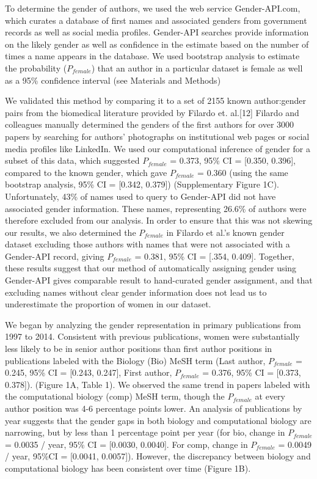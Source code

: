 \documentclass[10pt,letterpaper]{article}
\begin{document}
\begin{flushleft}
To determine the gender of authors, we used the web service Gender-API.com, which curates a database of first names and associated genders from government records as well as social media profiles. Gender-API searches provide information on the likely gender as well as confidence in the estimate based on the number of times a name appears in the database. We used bootstrap analysis to estimate the probability ($P_{female}$) that an author in a particular dataset is female as well as a 95\% confidence interval (see Materials and Methods)

We validated this method by comparing it to a set of 2155 known author:gender pairs from the biomedical literature provided by Filardo et. al.[12] Filardo and colleagues manually determined the genders of the first authors for over 3000 papers by searching for authors’ photographs on institutional web pages or social media profiles like LinkedIn. We used our computational inference of gender for a subset of this data, which suggested $P_{female}$ = 0.373, 95\% CI = [0.350, 0.396], compared to the known gender, which gave $P_{female}$ = 0.360 (using the same bootstrap analysis, 95\% CI = [0.342, 0.379]) (Supplementary Figure 1C). Unfortunately, 43\% of names used to query to Gender-API did not have associated gender information. These names, representing 26.6\% of authors were therefore excluded from our analysis. In order to ensure that this was not skewing our results, we also determined the $P_{female}$ in Filardo et al.'s known gender dataset excluding those authors with names that were not associated with a Gender-API record, giving $P_{female}$ = 0.381, 95\% CI = [.354, 0.409]. Together, these results suggest that our method of automatically assigning gender using Gender-API gives comparable result to hand-curated gender assignment, and that excluding names without clear gender information does not lead us to underestimate the proportion of women in our dataset.

We began by analyzing the gender representation in primary publications from 1997 to 2014. Consistent with previous publications, women were substantially less likely to be in senior author positions than first author positions in publications labeled with the Biology (Bio) MeSH term (Last author, $P_{female}$ = 0.245, 95\% CI = [0.243, 0.247], First author, $P_{female}$ = 0.376, 95\% CI = [0.373, 0.378]). (Figure 1A, Table 1). We observed the same trend in papers labeled with the computational biology (comp) MeSH term, though the $P_{female}$ at every author position was 4-6  percentage points lower. An analysis of publications by year suggests that the gender gaps in both biology and computational biology are narrowing, but by less than 1 percentage point  per year (for bio, change in $P_{female}$ = 0.0035 / year, 95\% CI = [0.0030, 0.0040]. For comp, change in $P_{female}$ = 0.0049 / year, 95\%CI = [0.0041, 0.0057]). However, the discrepancy between biology and computational biology has been consistent over time (Figure 1B).


\end{flushleft}
\end{document}
